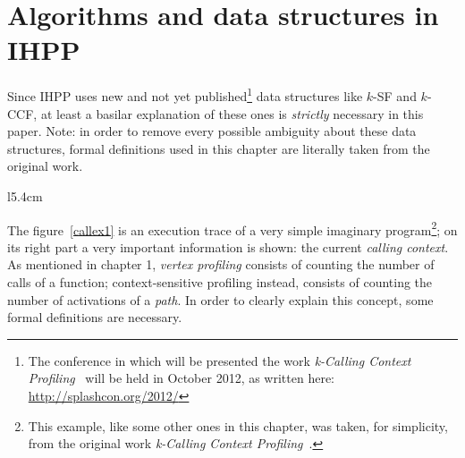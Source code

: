 \documentclass[a4paper,10pt]{report}
\begin{document}
\chapter{Algorithms and data structures in IHPP}
Since IHPP uses new and not yet published\footnote{The conference in which will be presented the work \emph{k-Calling Context
Profiling}~\cite{kccf} will be held in October 2012, as written here:
\mbox{\url{http://splashcon.org/2012/}}} data structures like $k$-SF and $k$-CCF, at least a basilar explanation of these ones is \emph{strictly} necessary in this paper.
Note: in order to remove every possible ambiguity about these data structures,
formal definitions used in this chapter are literally taken from the original work.

\begin{wrapfigure}[19]{l}{5.4cm}
\begin{center}


\caption{an execution trace}
\label{callex1}
\end{center}
\end{wrapfigure}
The figure~\ref{callex1} is an execution trace of a very simple imaginary program\footnote{This example, like some other ones in this chapter, was taken, for simplicity, from the original work \emph{k-Calling Context Profiling}~\cite{kccf}.}; on its right part a very important information is shown: the current \emph{calling context}.
As mentioned in chapter 1, \emph{vertex profiling} consists of counting the number of calls of a function; context-sensitive profiling instead, consists of counting the number of activations of a \emph{path}. In order to clearly explain this concept, some formal definitions are necessary.
\end{document}
